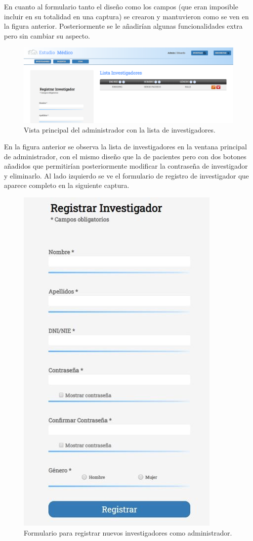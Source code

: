 En cuanto al formulario tanto el diseño como los campos (que eran imposible incluir en su totalidad en una captura) se crearon y mantuvieron como se ven en la figura anterior. Posteriormente se le añadirían algunas funcionalidades extra pero sin cambiar su aspecto.
\newpage

\begin{figure}[h]
    \centering
     \includegraphics[width=1\textwidth]{images/adminInvestigadores.png}
    \caption{Vista principal del administrador con la lista de investigadores.}
\end{figure}

En la figura anterior se observa la lista de investigadores en la ventana principal de administrador, con el mismo diseño que la de pacientes pero con dos botones añadidos que permitirían posteriormente modificar la contraseña de investigador y eliminarlo. Al lado izquierdo se ve el formulario de registro de investigador que aparece completo en la siguiente captura.

\begin{figure}[h]
    \centering
     \includegraphics[width=6.cm,height=10.cm]{images/registrarInvestigadores.jpg}
    \caption{Formulario para registrar nuevos investigadores como administrador.}
\end{figure}
\newpage

